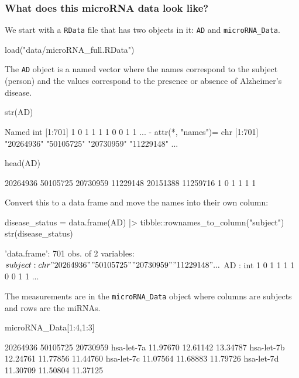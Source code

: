 \documentclass[a4paper]{article}
\begin{document}
\subsubsection{What does this microRNA data look like?}
We start with a \lstinline|RData| file that has two objects in it: \lstinline|AD| and \lstinline|microRNA_Data|.
\begin{Schunk}
\begin{Sinput}
load("data/microRNA_full.RData")
\end{Sinput}
\end{Schunk}
The \lstinline|AD| object is a named vector where the names correspond to the subject (person) and the values correspond to the presence or absence of Alzheimer's disease.
\begin{Schunk}
\begin{Sinput}
str(AD)
\end{Sinput}
\begin{Soutput}
 Named int [1:701] 1 0 1 1 1 1 0 0 1 1 ...
 - attr(*, "names")= chr [1:701] "20264936" "50105725" "20730959" "11229148" ...
\end{Soutput}
\begin{Sinput}
head(AD)
\end{Sinput}
\begin{Soutput}
20264936 50105725 20730959 11229148 20151388 11259716 
       1        0        1        1        1        1 
\end{Soutput}
\end{Schunk}
Convert this to a data frame and move the names into their own column:
\begin{Schunk}
\begin{Sinput}
disease_status = data.frame(AD) |> 
  tibble::rownames_to_column("subject")
str(disease_status)
\end{Sinput}
\begin{Soutput}
'data.frame':	701 obs. of  2 variables:
 $ subject: chr  "20264936" "50105725" "20730959" "11229148" ...
 $ AD     : int  1 0 1 1 1 1 0 0 1 1 ...
\end{Soutput}
\end{Schunk}
The measurements are in the \lstinline|microRNA_Data| object where columns are subjects and rows are the miRNAs.
\begin{Schunk}
\begin{Sinput}
microRNA_Data[1:4,1:3]
\end{Sinput}
\begin{Soutput}
           20264936 50105725 20730959
hsa-let-7a 11.97670 12.61142 13.34787
hsa-let-7b 12.24761 11.77856 11.44760
hsa-let-7c 11.07564 11.68883 11.79726
hsa-let-7d 11.30709 11.50804 11.37125
\end{Soutput}
\end{Schunk}
\end{document}

